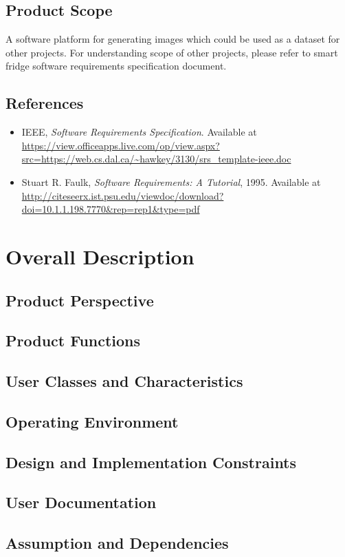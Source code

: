 \documentclass[a4paper,12pt]{article}
\begin{document}
\subsection{Product Scope}
A software platform for generating images which could be used as a dataset for other projects. For understanding scope of other projects, please refer to smart fridge software requirements specification document.
\subsection{References}
\begin{itemize}
\item IEEE, \textit{Software Requirements Specification}. Available at \url{https://view.officeapps.live.com/op/view.aspx?src=https://web.cs.dal.ca/~hawkey/3130/srs_template-ieee.doc}
\item Stuart R. Faulk, \textit{Software Requirements: A Tutorial}, 1995. Available at \url{http://citeseerx.ist.psu.edu/viewdoc/download?doi=10.1.1.198.7770&rep=rep1&type=pdf}
\end{itemize}
\newpage
\section{Overall Description}
\subsection{Product Perspective}
\subsection{Product Functions}
\subsection{User Classes and Characteristics}
\subsection{Operating Environment}
\subsection{Design and Implementation Constraints}
\subsection{User Documentation}
\subsection{Assumption and Dependencies}
\newpage
\end{document}
